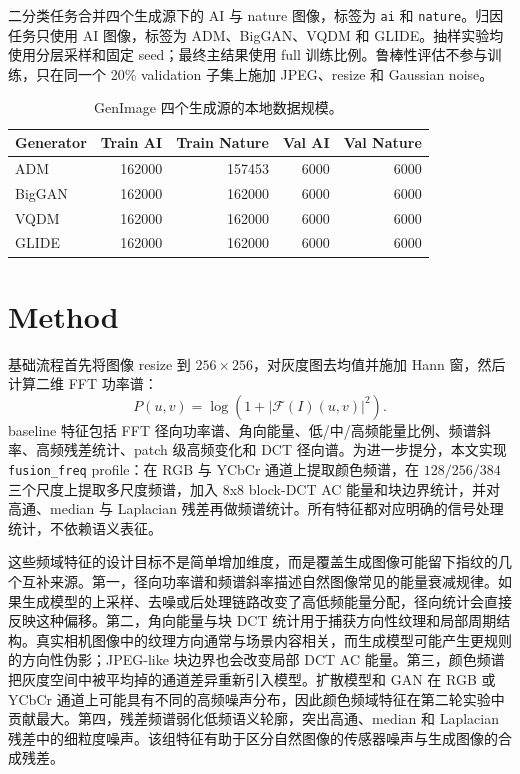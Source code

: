 \documentclass[sigconf,nonacm]{acmart}
\begin{document}
二分类任务合并四个生成源下的 AI 与 nature 图像，标签为 \texttt{ai} 和 \texttt{nature}。归因任务只使用 AI 图像，标签为 ADM、BigGAN、VQDM 和 GLIDE。抽样实验均使用分层采样和固定 seed；最终主结果使用 full 训练比例。鲁棒性评估不参与训练，只在同一个 20\% validation 子集上施加 JPEG、resize 和 Gaussian noise。

\begin{table}[H]
  \centering
  \caption{GenImage 四个生成源的本地数据规模。}
  \label{tab:dataset-counts}
  \begin{tabular}{lrrrr}
    \toprule
    Generator & Train AI & Train Nature & Val AI & Val Nature \\
    \midrule
    ADM & 162000 & 157453 & 6000 & 6000 \\
    BigGAN & 162000 & 162000 & 6000 & 6000 \\
    VQDM & 162000 & 162000 & 6000 & 6000 \\
    GLIDE & 162000 & 162000 & 6000 & 6000 \\
    \bottomrule
  \end{tabular}
\end{table}

\section{Method}
基础流程首先将图像 resize 到 $256\times256$，对灰度图去均值并施加 Hann 窗，然后计算二维 FFT 功率谱：
\[
P(u,v)=\log(1+|\mathcal{F}(I)(u,v)|^2).
\]
baseline 特征包括 FFT 径向功率谱、角向能量、低/中/高频能量比例、频谱斜率、高频残差统计、patch 级高频变化和 DCT 径向谱。为进一步提分，本文实现 \texttt{fusion\_freq} profile：在 RGB 与 YCbCr 通道上提取颜色频谱，在 $128/256/384$ 三个尺度上提取多尺度频谱，加入 8x8 block-DCT AC 能量和块边界统计，并对高通、median 与 Laplacian 残差再做频谱统计。所有特征都对应明确的信号处理统计，不依赖语义表征。

这些频域特征的设计目标不是简单增加维度，而是覆盖生成图像可能留下指纹的几个互补来源。第一，径向功率谱和频谱斜率描述自然图像常见的能量衰减规律。如果生成模型的上采样、去噪或后处理链路改变了高低频能量分配，径向统计会直接反映这种偏移。第二，角向能量与块 DCT 统计用于捕获方向性纹理和局部周期结构。真实相机图像中的纹理方向通常与场景内容相关，而生成模型可能产生更规则的方向性伪影；JPEG-like 块边界也会改变局部 DCT AC 能量。第三，颜色频谱把灰度空间中被平均掉的通道差异重新引入模型。扩散模型和 GAN 在 RGB 或 YCbCr 通道上可能具有不同的高频噪声分布，因此颜色频域特征在第二轮实验中贡献最大。第四，残差频谱弱化低频语义轮廓，突出高通、median 和 Laplacian 残差中的细粒度噪声。该组特征有助于区分自然图像的传感器噪声与生成图像的合成残差。
\end{document}
